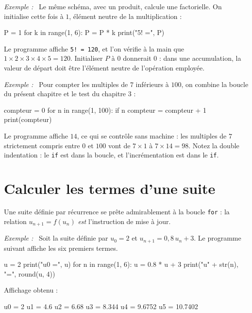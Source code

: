 \documentclass[a4paper,11pt,openany]{book}
\newcommand{\code}[1]{\texttt{\textcolor{codebleu}{#1}}}
\newenvironment{exemple}%
 {\par\vspace{1mm}\begin{list}{}{\leftmargin=1cm \rightmargin=0.5cm}\item[]%
  \textit{Exemple :}~}%
 {\end{list}\vspace{1mm}}
\begin{document}
\begin{exemple}
Le même schéma, avec un produit, calcule une factorielle. On initialise cette fois à $1$, élément neutre de la multiplication :
\begin{python}
P = 1
for k in range(1, 6):
    P = P * k
print("5! =", P)
\end{python}
Le programme affiche \code{5! = 120}, et l'on vérifie à la main que $1\times2\times3\times4\times5 = 120$. Initialiser $P$ à $0$ donnerait $0$ : dans une accumulation, la valeur de départ doit être l'élément neutre de l'opération employée.
\end{exemple}

\begin{exemple}
Pour compter les multiples de $7$ inférieurs à $100$, on combine la boucle du présent chapitre et le test du chapitre 3 :
\begin{python}
compteur = 0
for n in range(1, 100):
    if n %
        compteur = compteur + 1
print(compteur)
\end{python}
Le programme affiche $14$, ce qui se contrôle sans machine : les multiples de $7$ strictement compris entre $0$ et $100$ vont de $7\times1$ à $7\times14 = 98$. Notez la double indentation : le \code{if} est dans la boucle, et l'incrémentation est dans le \code{if}.
\end{exemple}

\section{Calculer les termes d'une suite}

Une suite définie par récurrence se prête admirablement à la boucle \code{for} : la relation $u_{n+1} = f(u_n)$ \emph{est} l'instruction de mise à jour.

\begin{exemple}
Soit la suite définie par $u_0 = 2$ et $u_{n+1} = 0{,}8\,u_n + 3$. Le programme suivant affiche les six premiers termes.
\begin{python}
u = 2
print("u0 =", u)
for n in range(1, 6):
    u = 0.8 * u + 3
    print("u" + str(n), "=", round(u, 4))
\end{python}
\end{exemple}

Affichage obtenu :

\begin{sortie}
u0 = 2
u1 = 4.6
u2 = 6.68
u3 = 8.344
u4 = 9.6752
u5 = 10.7402
\end{sortie}
\end{document}
